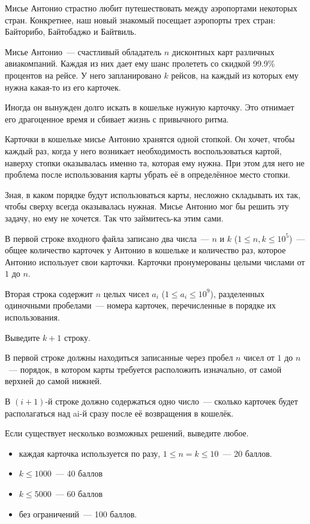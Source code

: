 
\Legend
Мисье Антонио страстно любит путешествовать между аэропортами некоторых стран. Конкретнее,
наш новый знакомый посещает аэропорты трех стран: Байторибо, Байтобаджо и Байтвиль.

Мисье Антонио~--- счастливый обладатель $n$ дисконтных карт различных авиакомпаний. Каждая из
них дает ему шанс пролететь со скидкой 99.9\% процентов на рейсе. У него запланировано $k$
рейсов, на каждый из которых ему нужна какая-то из его карточек.

Иногда он вынужден долго искать в кошельке нужную карточку. Это отнимает его драгоценное
время и сбивает жизнь с привычного ритма.

Карточки в кошельке мисье Антонио хранятся одной стопкой. Он хочет, чтобы каждый раз, когда
у него возникает необходимость воспользоваться картой, наверху стопки оказывалась именно та,
которая ему нужна. При этом для него не проблема после использования карты убрать её в
определённое место стопки.

Зная, в каком порядке будут использоваться карты, несложно складывать их так, чтобы сверху
всегда оказывалась нужная. Мисье Антонио мог бы решить эту задачу, но ему не хочется. Так что
займитесь-ка этим сами.

\Input
В первой строке входного файла записано два числа~--- $n$ и $k$ ($1 \le n, k \le 10^5$)~--- общее количество
карточек у Антонио в кошельке и количество раз, которое Антонио использует свои карточки.
Карточки пронумерованы целыми числами от $1$ до $n$.

Вторая строка содержит $n$ целых чисел $a_i$ ($1 \le a_i \le 10^9$), разделенных одиночными пробелами~---
номера карточек, перечисленные в порядке их использования.

\Output
Выведите $k+1$ строку.

В первой строке должны находиться записанные через пробел $n$ чисел от $1$ до $n$~--- порядок,
в котором карты требуется расположить изначально, от самой верхней до самой нижней.

В $(i+1)$-й строке должно содержаться одно число~--- сколько карточек будет располагаться
над ai-й сразу после её возвращения в кошелёк.

Если существует несколько возможных решений, выведите любое.

\Samples
\BeginTests
{}
\EndTests

\Scoring
\begin{itemize}
	\item каждая карточка используется по разу,
	$1 \le n = k \le 10$~--- 20 баллов.
	\item $k \le 1000$~--- 40 баллов
	\item $k \le 5000$~--- 60 баллов
	\item без ограничений~--- 100 баллов.
\end{itemize}

\EndProblem
